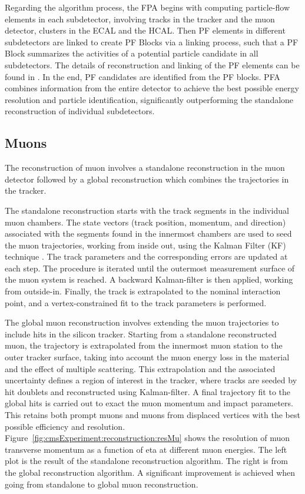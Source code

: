 Regarding the algorithm process, the FPA begins with computing particle-flow elements in each subdetector, involving tracks in the tracker and the muon detector, clusters in the ECAL and the HCAL. Then PF elements in different subdetectors are linked to create PF Blocks via a linking process, such that a PF Block summarizes the activities of a potential particle candidate in all subdetectors. The details of reconstruction and linking of the PF elements can be found in \cite{cms:particleflow:Sirunyan:2017ulk}. In the end, PF candidates are identified from the PF blocks. PFA combines information from the entire detector to achieve the best possible energy resolution and particle identification, significantly outperforming the standalone reconstruction of individual subdetectors.




\subsection{Muons}
\label{sec:cmsExperiment:reconstruction:muon}

The reconstruction of muon involves a standalone reconstruction in the muon detector followed by a global reconstruction which combines the trajectories in the tracker. 

The standalone reconstruction starts with the track segments in the individual muon chambers. The state vectors (track position, momentum, and direction) associated with the segments found in the innermost chambers are used to seed the muon trajectories, working from inside out, using the Kalman Filter (KF) technique \cite{tech:kf:Fruhwirth:1987fm}. The track parameters and the corresponding errors are updated at each step. The procedure is iterated until the outermost measurement surface of the muon system is reached. A backward Kalman-filter is then applied, working from outside-in. Finally, the track is extrapolated to the nominal interaction point, and a vertex-constrained fit to the track parameters is performed.

The global muon reconstruction involves extending the muon trajectories to include hits in the silicon tracker. Starting from a standalone reconstructed muon, the trajectory is extrapolated from the innermost muon station to the outer tracker surface, taking into account the muon energy loss in the material and the effect of multiple scattering. This extrapolation and the associated uncertainty defines a region of interest in the tracker, where tracks are seeded by hit doublets and reconstructed using Kalman-filter. A final trajectory fit to the global hits is carried out to exact the muon momentum and impact parameters. This retains both prompt muons and muons from displaced vertices with the best possible efficiency and resolution. Figure~\ref{fig:cmsExperiment:reconstruction:resMu} shows the resolution of muon transverse momentum as a function of eta at different muon energies. The left plot is the result of the standalone reconstruction algorithm. The right is from the global reconstruction algorithm. A significant improvement is achieved when going from standalone to global muon reconstruction.

